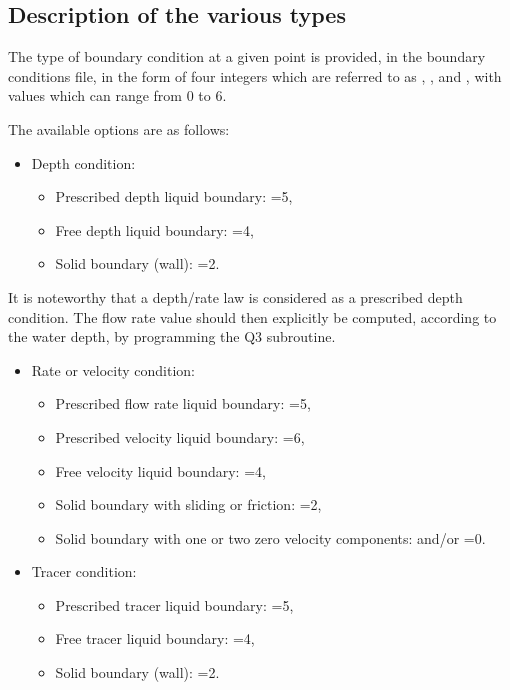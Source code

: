 \subsection{Description of the various types}
\label{sec:descr_bnd}

The type of boundary condition at a given point is provided, in the boundary
conditions file, in the form of four integers which are referred to as
, ,  and ,
with values which can range from 0 to 6.

The available options are as follows:

\begin{itemize}
\item Depth condition:

\begin{itemize}
\item Prescribed depth liquid boundary: =5,

\item Free depth liquid boundary: =4,

\item Solid boundary (wall): =2.
\end{itemize}
\end{itemize}

It is noteworthy that a depth/rate law is considered as a prescribed depth
condition. The flow rate value should then explicitly be computed, according to
the water depth, by programming the Q3 subroutine.

\begin{itemize}
\item Rate or velocity condition:

\begin{itemize}
\item Prescribed flow rate liquid boundary: =5,

\item Prescribed velocity liquid boundary: =6,

\item Free velocity liquid boundary: =4,

\item Solid boundary with sliding or friction: =2,

\item Solid boundary with one or two zero velocity components:  and/or
=0.
\end{itemize}

\item Tracer condition:

\begin{itemize}
\item Prescribed tracer liquid boundary: =5,

\item Free tracer liquid boundary: =4,

\item Solid boundary (wall): =2.
\end{itemize}
\end{itemize}



